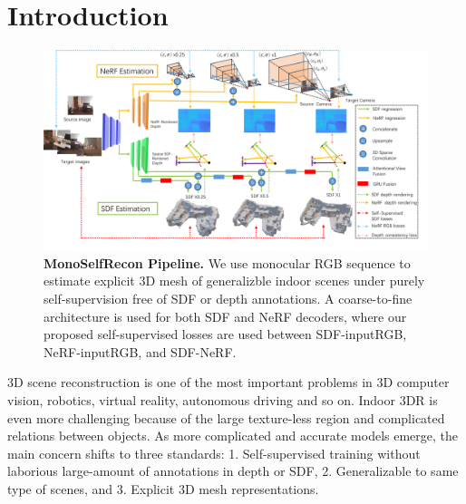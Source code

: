 \vspace{-5mm}
\section{Introduction}
\label{sec:intro}

\begin{figure}[t]
    \centering
    \includegraphics[width=\linewidth]{figures/pipeline.png}
    \vspace{-12mm}
    \caption{\textbf{MonoSelfRecon Pipeline.} We use monocular RGB sequence to estimate explicit 3D mesh of generalizble indoor scenes under purely self-supervision free of SDF or depth annotations. A coarse-to-fine architecture is used for both SDF and NeRF decoders, where our proposed self-supervised losses are used between SDF-inputRGB, NeRF-inputRGB, and SDF-NeRF.}
    \label{fig:pipeline}
    \vspace{-5mm}
\end{figure}


\quad 3D scene reconstruction is one of the most important problems in 3D computer vision, robotics, virtual reality, autonomous driving and so on. Indoor 3DR is even more challenging because of the large texture-less region and complicated relations between objects. As more complicated and accurate models emerge, the main concern shifts to three standards: 1. Self-supervised training without laborious large-amount of annotations in depth or SDF, 2. Generalizable to same type of scenes, and 3. Explicit 3D mesh representations.


